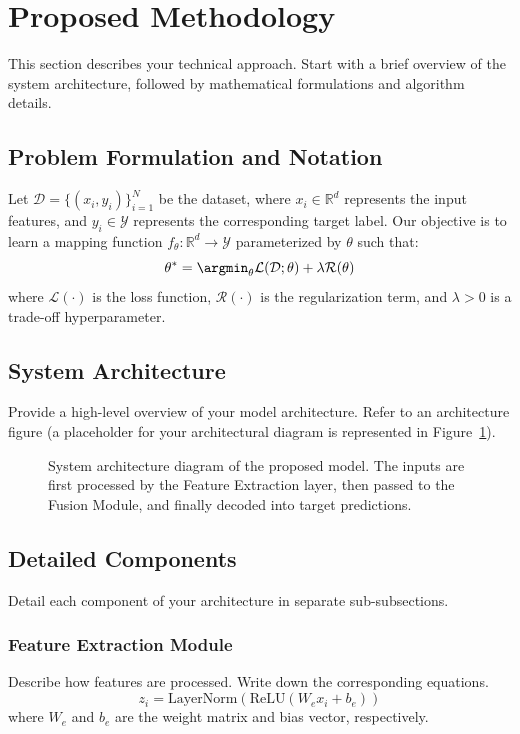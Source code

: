 \section{Proposed Methodology}\label{sec:methodology}
This section describes your technical approach. Start with a brief overview of the system architecture, followed by mathematical formulations and algorithm details.

\subsection{Problem Formulation and Notation}
Let $\mathcal{D} = \{(x_i, y_i)\}_{i=1}^N$ be the dataset, where $x_i \in \mathbb{R}^d$ represents the input features, and $y_i \in \mathcal{Y}$ represents the corresponding target label. Our objective is to learn a mapping function $f_\theta: \mathbb{R}^d \rightarrow \mathcal{Y}$ parameterized by $\theta$ such that:
\begin{equation}
\theta^* = \argmin_\theta \mathcal{L}(\mathcal{D}; \theta) + \lambda \mathcal{R}(\theta)
\label{eq:objective_function}
\end{equation}
where $\mathcal{L}(\cdot)$ is the loss function, $\mathcal{R}(\cdot)$ is the regularization term, and $\lambda > 0$ is a trade-off hyperparameter.

\subsection{System Architecture}
Provide a high-level overview of your model architecture. Refer to an architecture figure (a placeholder for your architectural diagram is represented in Figure~\ref{fig:architecture}).

\begin{figure}[h]
\centering
\fbox{\rule{0pt}{2in} \rule{0.9\linewidth}{0pt}} %
\caption{System architecture diagram of the proposed model. The inputs are first processed by the Feature Extraction layer, then passed to the Fusion Module, and finally decoded into target predictions.}\label{fig:architecture}
\end{figure}

\subsection{Detailed Components}
Detail each component of your architecture in separate sub-subsections.

\subsubsection{Feature Extraction Module}
Describe how features are processed. Write down the corresponding equations.
\begin{equation}
z_i = \text{LayerNorm}(\text{ReLU}(W_e x_i + b_e))
\label{eq:feature_extraction}
\end{equation}
where $W_e$ and $b_e$ are the weight matrix and bias vector, respectively.


